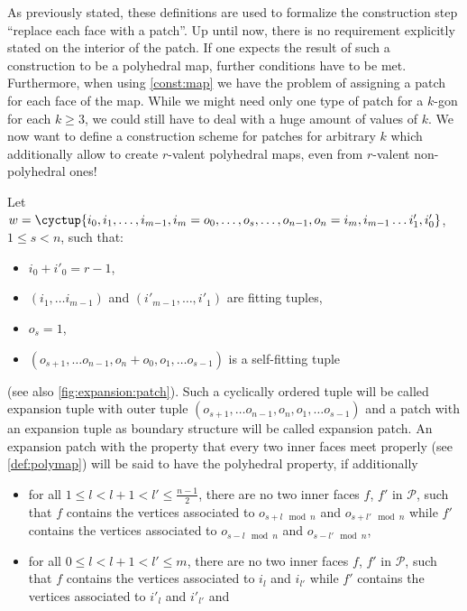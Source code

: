 \begin{construction}
\begin{cdescription}
  \end{cdescription}
\end{construction}

As previously stated, these definitions are used to formalize the construction step ``replace each face with a patch''. Up until now, there is no requirement explicitly stated on the interior of the patch. If one expects the result of such a construction to be a polyhedral map, further conditions have to be met. Furthermore, when using \autoref{const:map} we have the problem of assigning a patch for each face of the map. While we might need only one type of patch for a $k$-gon for each $k \geq 3$, we could still have to deal with a huge amount of values of $k$. We now want to define a construction scheme for patches for arbitrary $k$ which additionally allow to create $r$-valent polyhedral maps, even from $r$-valent non-polyhedral ones!

\begin{definition} Let $w = \cyctup{i_0, i_1, \dots, i_{m-1}, i_m = o_0, \dots, o_s, \dots, o_{n - 1}, o_n = i_m, i_{m-1} \dots i'_1, i'_0}$, $1 \leq s < n$, such that:
  \begin{itemize}
  \item $i_0 + i'_0 = r - 1$,
  \item $(i_1, \dots i_{m-1})$ and $(i'_{m-1}, \dots, i'_1)$ are fitting tuples,
  \item $o_s = 1$,
  \item $(o_{s + 1}, \dots o_{n - 1}, o_n + o_0, o_1, \dots o_{s - 1})$ is a self-fitting tuple
  \end{itemize}
  (see also \autoref{fig:expansion:patch}). Such a cyclically ordered tuple will be called expansion tuple with outer tuple $(o_{s + 1}, \dots o_{n - 1}, o_n, o_1, \dots o_{s - 1})$ and a patch with an expansion tuple as boundary structure will be called expansion patch. An expansion patch with the property that every two inner faces meet properly (see \autoref{def:polymap}) will be said to have the polyhedral property, if additionally 
  \begin{itemize}
  \item for all $1 \leq l < l + 1 < l' \leq \frac{n - 1}{2}$, there are no two inner faces $f$, $f'$ in $\mathcal{P}$, such that $f$ contains the vertices associated to $o_{s + l \mod n}$ and $o_{s + l' \mod n}$ while $f'$ contains the vertices associated to $o_{s - l \mod n}$ and $o_{s - l' \mod n}$,
  \item for all $0 \leq l < l + 1 < l' \leq m$, there are no two inner faces $f$, $f'$ in $\mathcal{P}$, such that $f$ contains the vertices associated to $i_{l}$ and $i_{l'}$ while $f'$ contains the vertices associated to $i'_{l}$ and $i'_{l'}$ and
  \end{itemize}
\end{definition}

